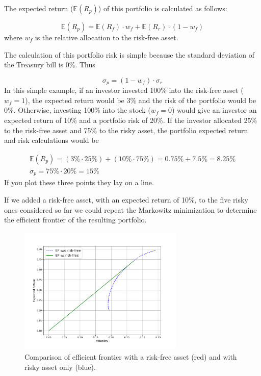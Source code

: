 The expected return (\(\mathbb{E}(R_p)\)) of this portfolio is calculated as follows:

\begin{equation*} 
\mathbb{E}(R_p) = \mathbb{E}(R_f)\cdot w_f + \mathbb{E}(R_r)\cdot (1- w_f) 
\end{equation*}
where \(w_f\) is the relative allocation to the risk-free asset.

The calculation of this portfolio risk is simple because the standard deviation of the Treasury bill is 0\%. Thus

\begin{equation*} 
\sigma_p = (1-w_f)\cdot \sigma_r 
\end{equation*}
In this simple example, if an investor invested 100\% into the risk-free asset (\(w_f=1\)), the expected return would be 3\% and the risk of the portfolio would be 0\%. Otherwise, investing 100\% into the stock (\(w_f=0\)) would give an investor an expected return of 10\% and a portfolio risk of 20\%. If the investor allocated 25\% to the risk-free asset and 75\% to the risky asset, the portfolio expected return and risk calculations would be

\begin{equation*}
\begin{gathered}
\mathbb{E}(R_p) = (3\% \cdot 25\%) + (10\% \cdot 75\%) = 0.75\% + 7.5\% = 8.25\% \\
\sigma_p = 75\% \cdot 20\% = 15\% 
\end{gathered}
\end{equation*}
\noindent
If you plot these three points they lay on a line.

If we added a risk-free asset, with an expected return of 10\%, to the five risky ones considered so far we could repeat the Markowitz minimization to determine the efficient frontier of the resulting portfolio. 


\begin{figure}[htb]
\centering
\includegraphics[width=0.7\textwidth]{figures/cal}
\caption{Comparison of efficient frontier with a risk-free asset (red) and with risky asset only (blue).}
\label{fig:cal}
\end{figure}
    
